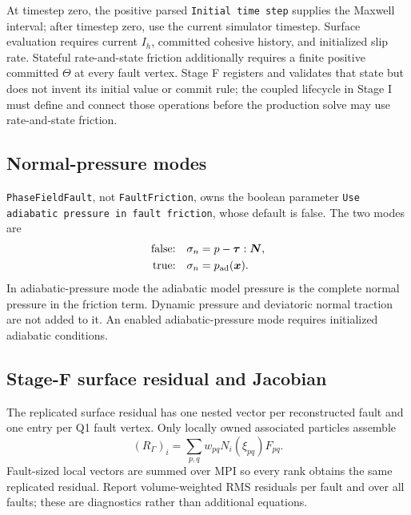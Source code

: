 \documentclass[11pt]{article}
\begin{document}
At timestep zero, the positive parsed \texttt{Initial time step} supplies the
Maxwell interval; after timestep zero, use the current simulator timestep.
Surface evaluation requires current $I_h$, committed cohesive history, and
initialized slip rate.  Stateful rate-and-state friction additionally
requires a finite positive committed $\Theta$ at every fault vertex.  Stage F
registers and validates that state but does not invent its initial value or
commit rule; the coupled lifecycle in Stage I must define and connect those
operations before the production solve may use rate-and-state friction.

\subsection{Normal-pressure modes}

\texttt{PhaseFieldFault}, not \texttt{FaultFriction}, owns the boolean
parameter \texttt{Use adiabatic pressure in fault friction}, whose default is
false.  The two modes are
\begin{equation}
 \begin{aligned}
  \text{false:}\quad &\sigma_n=p-\boldsymbol\tau:\boldsymbol N,\\
  \text{true:}\quad  &\sigma_n=p_{\rm ad}(\boldsymbol x).
 \end{aligned}
\end{equation}
In adiabatic-pressure mode the adiabatic model pressure is the complete normal
pressure in the friction term.  Dynamic pressure and deviatoric normal
traction are not added to it.  An enabled adiabatic-pressure mode requires
initialized adiabatic conditions.

\subsection{Stage-F surface residual and Jacobian}

The replicated surface residual has one nested vector per reconstructed fault
and one entry per Q1 fault vertex.  Only locally owned associated particles
assemble
\begin{equation}
 (R_\Gamma)_i=\sum_{p,q} w_{pq}N_i(\xi_{pq})F_{pq}.
\end{equation}
Fault-sized local vectors are summed over MPI so every rank obtains the same
replicated residual.  Report volume-weighted RMS residuals per fault and over
all faults; these are diagnostics rather than additional equations.
\end{document}
